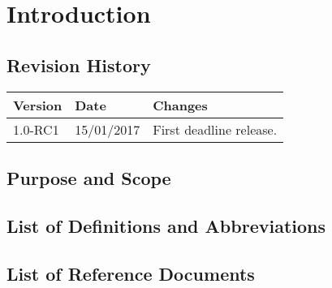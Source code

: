 \section{Introduction}

\subsection{Revision History}
\begin{tabular}{| l | l | p{10cm} |}
\hline
\textbf{Version} & \textbf{Date} & \textbf{Changes}\\
\hline
1.0-RC1 & 15/01/2017 & First deadline release.\\
\hline
\end{tabular}

\subsection{Purpose and Scope}

\subsection{List of Definitions and Abbreviations}

\subsection{List of Reference Documents}
